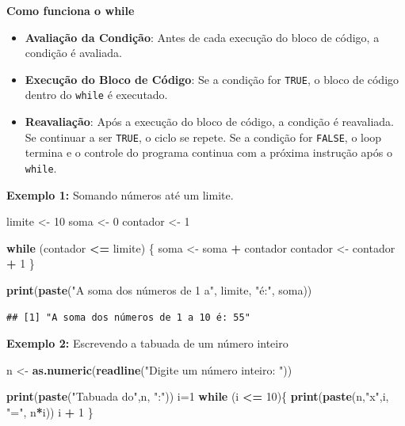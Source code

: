 \documentclass[
]{book}
\newenvironment{Shaded}{\begin{snugshade}}{\end{snugshade}}
\newcommand{\ControlFlowTok}[1]{\textcolor[rgb]{0.13,0.29,0.53}{\textbf{#1}}}
\newcommand{\DecValTok}[1]{\textcolor[rgb]{0.00,0.00,0.81}{#1}}
\newcommand{\FunctionTok}[1]{\textcolor[rgb]{0.13,0.29,0.53}{\textbf{#1}}}
\newcommand{\NormalTok}[1]{#1}
\newcommand{\OtherTok}[1]{\textcolor[rgb]{0.56,0.35,0.01}{#1}}
\newcommand{\SpecialCharTok}[1]{\textcolor[rgb]{0.81,0.36,0.00}{\textbf{#1}}}
\newcommand{\StringTok}[1]{\textcolor[rgb]{0.31,0.60,0.02}{#1}}
\theoremstyle{definition}
\theoremstyle{definition}
\theoremstyle{definition}
\theoremstyle{definition}
\theoremstyle{remark}
\begin{document}
\textbf{Como funciona o while}

\begin{itemize}
\item
  \textbf{Avaliação da Condição}: Antes de cada execução do bloco de código, a condição é avaliada.
\item
  \textbf{Execução do Bloco de Código}: Se a condição for \texttt{TRUE}, o bloco de código dentro do \texttt{while} é executado.
\item
  \textbf{Reavaliação}: Após a execução do bloco de código, a condição é reavaliada. Se continuar a ser \texttt{TRUE}, o ciclo se repete. Se a condição for \texttt{FALSE}, o loop termina e o controle do programa continua com a próxima instrução após o \texttt{while}.
\end{itemize}

\textbf{Exemplo 1:} Somando números até um limite.

\begin{Shaded}
\begin{Highlighting}[]
\NormalTok{limite }\OtherTok{\textless{}{-}} \DecValTok{10}
\NormalTok{soma }\OtherTok{\textless{}{-}} \DecValTok{0}
\NormalTok{contador }\OtherTok{\textless{}{-}} \DecValTok{1}

\ControlFlowTok{while}\NormalTok{ (contador }\SpecialCharTok{\textless{}=}\NormalTok{ limite) \{}
\NormalTok{  soma }\OtherTok{\textless{}{-}}\NormalTok{ soma }\SpecialCharTok{+}\NormalTok{ contador}
\NormalTok{  contador }\OtherTok{\textless{}{-}}\NormalTok{ contador }\SpecialCharTok{+} \DecValTok{1}
\NormalTok{\}}

\FunctionTok{print}\NormalTok{(}\FunctionTok{paste}\NormalTok{(}\StringTok{"A soma dos números de 1 a"}\NormalTok{, limite, }\StringTok{"é:"}\NormalTok{, soma))}
\end{Highlighting}
\end{Shaded}

\begin{verbatim}
## [1] "A soma dos números de 1 a 10 é: 55"
\end{verbatim}

\textbf{Exemplo 2:} Escrevendo a tabuada de um número inteiro

\begin{Shaded}
\begin{Highlighting}[]
\NormalTok{n }\OtherTok{\textless{}{-}} \FunctionTok{as.numeric}\NormalTok{(}\FunctionTok{readline}\NormalTok{(}\StringTok{"Digite um número inteiro: "}\NormalTok{))}

\FunctionTok{print}\NormalTok{(}\FunctionTok{paste}\NormalTok{(}\StringTok{"Tabuada do"}\NormalTok{,n, }\StringTok{":"}\NormalTok{))}
\NormalTok{i}\OtherTok{=}\DecValTok{1}
\ControlFlowTok{while}\NormalTok{ (i }\SpecialCharTok{\textless{}=} \DecValTok{10}\NormalTok{)\{  }
  \FunctionTok{print}\NormalTok{(}\FunctionTok{paste}\NormalTok{(n,}\StringTok{"x"}\NormalTok{,i, }\StringTok{"="}\NormalTok{, n}\SpecialCharTok{*}\NormalTok{i))  }
\NormalTok{  i }\SpecialCharTok{+} \DecValTok{1}
\NormalTok{\}}
\end{Highlighting}
\end{Shaded}
\end{document}
